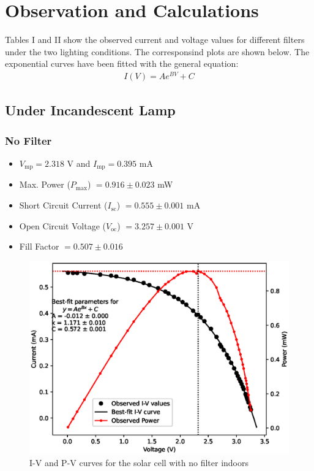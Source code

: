 \section{Observation and Calculations}

Tables I and II show the observed current and voltage values for different filters under the two lighting conditions. The corresponsind plots are shown below. The exponential curves have been fitted with the general equation:
\begin{align}
    I(V) = Ae^{BV} + C
\end{align}




\subsection{Under Incandescent Lamp}

\subsubsection{No Filter}
\begin{itemize}
    \item $V_\text{mp} = 2.318$ V and $I_\text{mp} = 0.395$ mA
    \item Max. Power ($P_\text{max}$) $= 0.916 \pm 0.023 $ mW
    \item Short Circuit Current ($I_\text{sc}$) $= 0.555 \pm 0.001$ mA
    \item Open Circuit Voltage ($V_\text{oc}$) $= 3.257 \pm 0.001$ V
    \item Fill Factor $= 0.507 \pm 0.016$
\end{itemize}

\begin{figure}[H]
    \centering
    \includegraphics[width=1\columnwidth]{images/in/no.eps}
    \caption{I-V and P-V curves for the solar cell with no filter indoors}
\end{figure}

